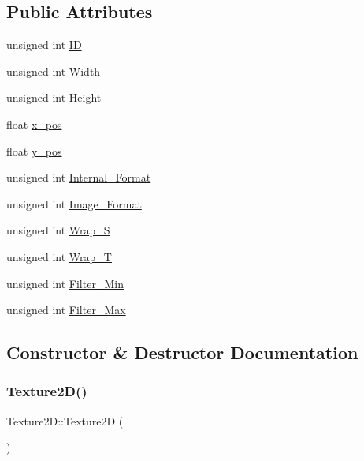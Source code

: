 \subsection*{Public Attributes}
\begin{DoxyCompactItemize}
\item 
unsigned int \hyperlink{classTexture2D_ac5639377a74a227b0b2369c159dc6d46}{ID}
\item 
unsigned int \hyperlink{classTexture2D_a558054990d7e668b9df119713922fa53}{Width}
\item 
unsigned int \hyperlink{classTexture2D_a640768f0078c4c96c7fb80150c548201}{Height}
\item 
float \hyperlink{classTexture2D_a5d7a290a99c99a921e0bbed6e8b529f8}{x\+\_\+pos}
\item 
float \hyperlink{classTexture2D_aeb7e15444821c2bb23d5026ca4430e58}{y\+\_\+pos}
\item 
unsigned int \hyperlink{classTexture2D_a9491c93c156e1a33a4c8d0116aedfffa}{Internal\+\_\+\+Format}
\item 
unsigned int \hyperlink{classTexture2D_a9e4a5f6606148ac84be4c8c096553808}{Image\+\_\+\+Format}
\item 
unsigned int \hyperlink{classTexture2D_a95dc93c0a76a5d30d7b1fade841a58df}{Wrap\+\_\+S}
\item 
unsigned int \hyperlink{classTexture2D_a80e39ea4cf66bbed444cdf135afffb92}{Wrap\+\_\+T}
\item 
unsigned int \hyperlink{classTexture2D_a09545dae0e8b68db570506e3aae8e99b}{Filter\+\_\+\+Min}
\item 
unsigned int \hyperlink{classTexture2D_ac4c49410570a07a5b7fd0ec4a18ab646}{Filter\+\_\+\+Max}
\end{DoxyCompactItemize}


\subsection{Constructor \& Destructor Documentation}
\mbox{\label{classTexture2D_ab62c7c5172a4800b4629cd475147819d}} 
\subsubsection{\texorpdfstring{Texture2\+D()}{Texture2D()}}
{\footnotesize\ttfamily Texture2\+D\+::\+Texture2D (\begin{DoxyParamCaption}{ }\end{DoxyParamCaption})}



